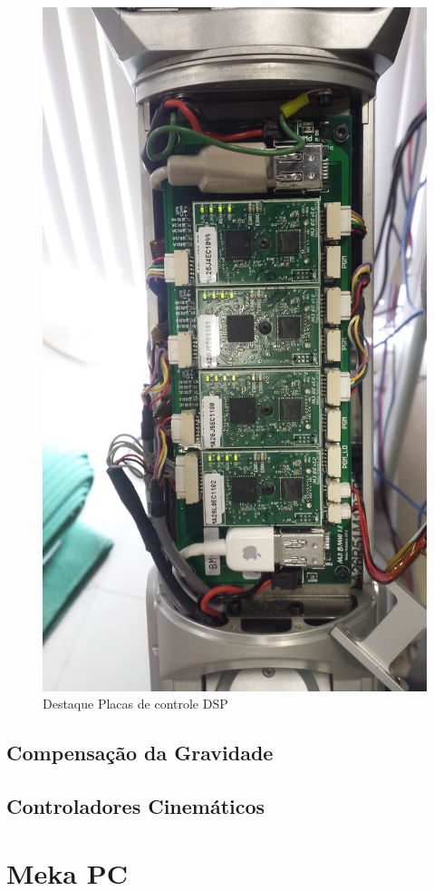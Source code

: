 \begin{figure}[H]
    \centering
    \includegraphics[width = 0.7\linewidth]{figs/dsp-control-wrist}
    \caption{Destaque Placas de controle DSP}
    \label{fig:maxon-flat-servo}
\end{figure}

\subsection{Compensação da Gravidade}


\subsection{Controladores Cinemáticos}

\section{Meka PC}

